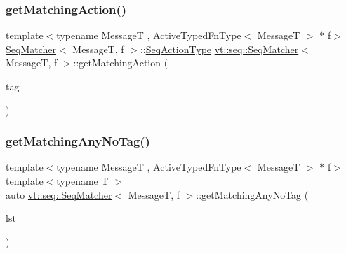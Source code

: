 \mbox{\label{structvt_1_1seq_1_1_seq_matcher_ac6949485f86eb24ec9af508c636d3b9d}} 
\subsubsection{\texorpdfstring{get\+Matching\+Action()}{getMatchingAction()}}
{\footnotesize\ttfamily template$<$typename MessageT , Active\+Typed\+Fn\+Type$<$ Message\+T $>$ $\ast$ f$>$ \\
\hyperlink{structvt_1_1seq_1_1_seq_matcher}{Seq\+Matcher}$<$ MessageT, f $>$\+::\hyperlink{structvt_1_1seq_1_1_seq_matcher_a180f9f54ad9d6d65893a36fe8b5b89e3}{Seq\+Action\+Type} \hyperlink{structvt_1_1seq_1_1_seq_matcher}{vt\+::seq\+::\+Seq\+Matcher}$<$ MessageT, f $>$\+::get\+Matching\+Action (\begin{DoxyParamCaption}\item[{\hyperlink{namespacevt_a84ab281dae04a52a4b243d6bf62d0e52}{Tag\+Type} const \&}]{tag }\end{DoxyParamCaption})\hspace{0.3cm}{\ttfamily [static]}}

\mbox{\label{structvt_1_1seq_1_1_seq_matcher_a2fbb578d7c1950e56c572fb5e32dc212}} 
\subsubsection{\texorpdfstring{get\+Matching\+Any\+No\+Tag()}{getMatchingAnyNoTag()}}
{\footnotesize\ttfamily template$<$typename MessageT , Active\+Typed\+Fn\+Type$<$ Message\+T $>$ $\ast$ f$>$ \\
template$<$typename T $>$ \\
auto \hyperlink{structvt_1_1seq_1_1_seq_matcher}{vt\+::seq\+::\+Seq\+Matcher}$<$ MessageT, f $>$\+::get\+Matching\+Any\+No\+Tag (\begin{DoxyParamCaption}\item[{\hyperlink{structvt_1_1seq_1_1_seq_matcher_ad8e84a5a494218cd582d8467552b5ff7}{Seq\+State\+Cont\+Type}$<$ T $>$ \&}]{lst }\end{DoxyParamCaption})\hspace{0.3cm}{\ttfamily [static]}}

